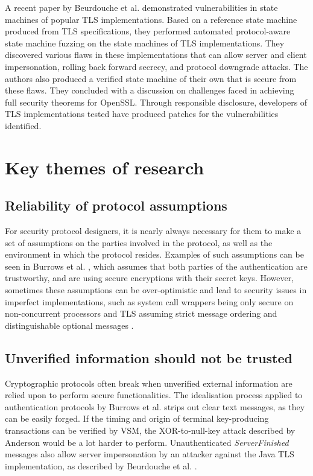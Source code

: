 \documentclass[11pt]{article}
\begin{document}
A recent paper by Beurdouche et al. \cite{beurdouche2015messy} demonstrated vulnerabilities in state machines of popular TLS implementations. Based on a reference state machine produced from TLS specifications, they performed automated protocol-aware state machine fuzzing on the state machines of TLS implementations. They discovered various flaws in these implementations that can allow server and client impersonation, rolling back forward secrecy, and protocol downgrade attacks. The authors also produced a verified state machine of their own that is secure from these flaws. They concluded with a discussion on challenges faced in achieving full security theorems for OpenSSL. Through responsible disclosure, developers of TLS implementations tested have produced patches for the vulnerabilities identified.

\section{Key themes of research}

\subsection{Reliability of protocol assumptions}

For security protocol designers, it is nearly always necessary for them to make a set of assumptions on the parties involved in the protocol, as well as the environment in which the protocol resides. Examples of such assumptions can be seen in Burrows et al. \cite[Sec. 1, 2.2]{burrows1989logic}, which assumes that both parties of the authentication are trustworthy, and are using secure encryptions with their secret keys. However, sometimes these assumptions can be over-optimistic and lead to security issues in imperfect implementations, such as system call wrappers being only secure on non-concurrent processors \cite[18.3]{anderson2010security} and TLS assuming strict message ordering and distinguishable optional messages \cite[Sec. II]{beurdouche2015messy}.

\subsection{Unverified information should not be trusted}

Cryptographic protocols often break when unverified external information are relied upon to perform secure functionalities. The idealisation process applied to authentication protocols by Burrows et al. \cite[2.4]{burrows1989logic} strips out clear text messages, as they can be easily forged. If the timing and origin of terminal key-producing transactions can be verified by VSM, the XOR-to-null-key attack described by Anderson \cite[18.2.1]{anderson2010security} would be a lot harder to perform. Unauthenticated \emph{ServerFinished} messages also allow server impersonation by an attacker against the Java TLS implementation, as described by Beurdouche et al. \cite[V-A]{beurdouche2015messy}.
\end{document}
